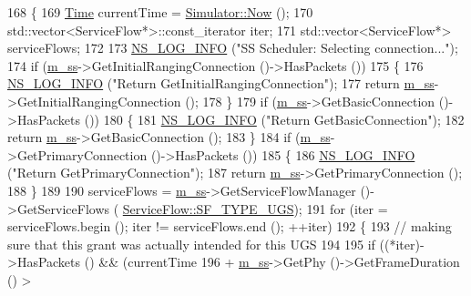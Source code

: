 \begin{DoxyCode}
168 \{
169   \hyperlink{namespacens3_1_1TracedValueCallback_a7ffd3e7c142ffe7c8a1d2db9b8de38ec}{Time} currentTime = \hyperlink{classns3_1_1Simulator_ac3178fa975b419f7875e7105be122800}{Simulator::Now} ();
170   std::vector<ServiceFlow*>::const\_iterator iter;
171   std::vector<ServiceFlow*> serviceFlows;
172 
173   \hyperlink{group__logging_gafbd73ee2cf9f26b319f49086d8e860fb}{NS\_LOG\_INFO} (\textcolor{stringliteral}{"SS Scheduler: Selecting connection..."});
174   \textcolor{keywordflow}{if} (\hyperlink{classns3_1_1SSScheduler_a9a0b3cae20f18593e3d150e7534ce678}{m\_ss}->GetInitialRangingConnection ()->HasPackets ())
175     \{
176       \hyperlink{group__logging_gafbd73ee2cf9f26b319f49086d8e860fb}{NS\_LOG\_INFO} (\textcolor{stringliteral}{"Return GetInitialRangingConnection"});
177       \textcolor{keywordflow}{return} \hyperlink{classns3_1_1SSScheduler_a9a0b3cae20f18593e3d150e7534ce678}{m\_ss}->GetInitialRangingConnection ();
178     \}
179   \textcolor{keywordflow}{if} (\hyperlink{classns3_1_1SSScheduler_a9a0b3cae20f18593e3d150e7534ce678}{m\_ss}->GetBasicConnection ()->HasPackets ())
180     \{
181       \hyperlink{group__logging_gafbd73ee2cf9f26b319f49086d8e860fb}{NS\_LOG\_INFO} (\textcolor{stringliteral}{"Return GetBasicConnection"});
182       \textcolor{keywordflow}{return} \hyperlink{classns3_1_1SSScheduler_a9a0b3cae20f18593e3d150e7534ce678}{m\_ss}->GetBasicConnection ();
183     \}
184   \textcolor{keywordflow}{if} (\hyperlink{classns3_1_1SSScheduler_a9a0b3cae20f18593e3d150e7534ce678}{m\_ss}->GetPrimaryConnection ()->HasPackets ())
185     \{
186       \hyperlink{group__logging_gafbd73ee2cf9f26b319f49086d8e860fb}{NS\_LOG\_INFO} (\textcolor{stringliteral}{"Return GetPrimaryConnection"});
187       \textcolor{keywordflow}{return} \hyperlink{classns3_1_1SSScheduler_a9a0b3cae20f18593e3d150e7534ce678}{m\_ss}->GetPrimaryConnection ();
188     \}
189 
190   serviceFlows = \hyperlink{classns3_1_1SSScheduler_a9a0b3cae20f18593e3d150e7534ce678}{m\_ss}->GetServiceFlowManager ()->GetServiceFlows (
      \hyperlink{classns3_1_1ServiceFlow_a7990ba10be1e098328fd1e6382a26235a969e0b62fa12fef1dbb23913744ed594}{ServiceFlow::SF\_TYPE\_UGS});
191   \textcolor{keywordflow}{for} (iter = serviceFlows.begin (); iter != serviceFlows.end (); ++iter)
192     \{
193       \textcolor{comment}{// making sure that this grant was actually intended for this UGS}
194 
195       \textcolor{keywordflow}{if} ((*iter)->HasPackets () && (currentTime
196                                      + \hyperlink{classns3_1_1SSScheduler_a9a0b3cae20f18593e3d150e7534ce678}{m\_ss}->GetPhy ()->GetFrameDuration () > 

\end{DoxyCode}
